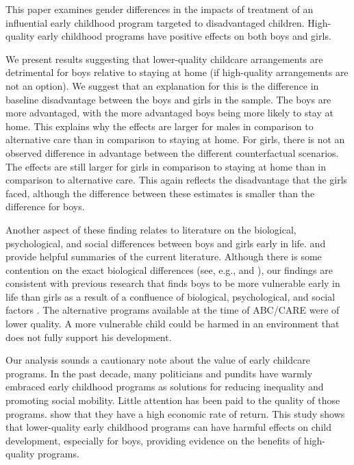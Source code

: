This paper examines gender differences in the impacts of treatment of an influential early childhood program targeted to disadvantaged children. High-quality early childhood programs have positive effects on both boys and girls. 

We present results suggesting that lower-quality childcare arrangements are detrimental for boys relative to staying at home (if high-quality arrangements are not an option). We suggest that an explanation for this is the difference in baseline disadvantage between the boys and girls in the sample. The boys are more advantaged, with the more advantaged boys being more likely to stay at home. This explains why the effects are larger for males in comparison to alternative care than in comparison to staying at home. For girls, there is not an observed difference in advantage between the different counterfactual scenarios. The effects are still larger for girls in comparison to staying at home than in comparison to alternative care. This again reflects the disadvantage that the girls faced, although the difference between these estimates is smaller than the difference for boys.

Another aspect of these finding relates to literature on the biological, psychological, and social differences between boys and girls early in life. \citet{Schore_2017_IMHJ} and \citet{Eliot_Brain_2009_BOOK} provide helpful summaries of the current literature. Although there is some contention on the exact biological differences (see, e.g., \citet{Tan_Ma_Marwha_etal_2016_NI} and \citet{Eliot_2011_Sex-Diff_Neuron}), our findings are consistent with previous research that finds boys to be more vulnerable early in life than girls as a result of a confluence of biological, psychological, and social factors \citep{Beeghly-etal_2017_IMHJ}. The alternative programs available at the time of ABC/CARE were of lower quality. A more vulnerable child could be harmed in an environment that does not fully support his development.

Our analysis sounds a cautionary note about the value of early childcare programs. In the past decade, many politicians and pundits have warmly embraced early childhood programs as solutions for reducing inequality and promoting social mobility. Little attention has been paid to the quality of those programs. \cite{Garcia_Heckman_Leaf_etal_2017_Comp_CBA_Unpublished} show that they have a high economic rate of return. This study shows that lower-quality early childhood programs can have harmful effects on child development, especially for boys, providing evidence on the benefits of high-quality programs.

